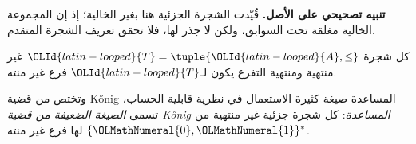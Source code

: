 \documentclass[../../../include/open-logic-section]{subfiles}
\begin{document}
\textbf{تنبيه تصحيحي على الأصل.} قُيّدت الشجرة الجزئية هنا بغير الخالية؛
إذ إن المجموعة الخالية مغلقة تحت السوابق، ولكن لا جذر لها، فلا تحقق تعريف
الشجرة المتقدم.

\begin{prop}
كل شجرة $\OLId{latin-looped}{T} = \tuple{\OLId{latin-looped}{A},\le}$ غير منتهية ومنتهية التفرع يكون لـ$\OLId{latin-looped}{T}$ فرع غير منته.
\end{prop}

وتختص من قضية \foreignlanguage{english}{K\H{o}nig} المساعدة
صيغة كثيرة الاستعمال في نظرية قابلية الحساب، تسمى
\emph{الصيغة الضعيفة من قضية \foreignlanguage{english}{K\H{o}nig} المساعدة}:
كل شجرة جزئية غير منتهية من $\{\OLMathNumeral{0},\OLMathNumeral{1}\}^*$ لها فرع غير منته.
\end{document}
